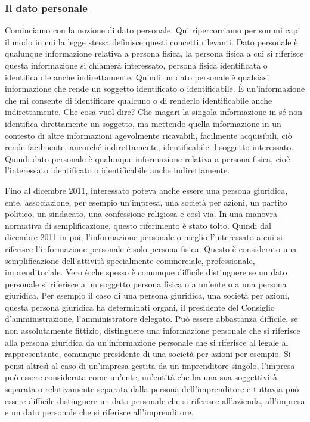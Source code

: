 \subsubsection{Il dato personale}
Cominciamo con la nozione di dato personale. Qui ripercorriamo per sommi capi il modo in cui la legge stessa definisce questi concetti rilevanti. Dato personale è qualunque informazione relativa a persona fisica, la persona fisica a cui si riferisce questa informazione si chiamerà interessato, persona fisica identificata o identificabile anche indirettamente. Quindi un dato personale è qualsiasi informazione che rende un soggetto identificato o identificabile. 
È un'informazione che mi consente di identificare qualcuno o di renderlo identificabile anche indirettamente. 
Che cosa vuol dire? Che magari la singola informazione in sé non identifica direttamente un soggetto, ma mettendo quella informazione in un contesto di altre informazioni agevolmente ricavabili, facilmente acquisibili, ciò rende facilmente, ancorché indirettamente, identificabile il soggetto interessato. Quindi dato personale è qualunque informazione relativa a persona fisica, cioè l'interessato identificato o identificabile anche indirettamente. 

Fino al dicembre 2011, interessato poteva anche essere una persona giuridica, ente, associazione, per esempio un'impresa, una società per azioni, un partito politico, un sindacato, una confessione religiosa e così via. In una manovra normativa di semplificazione, questo riferimento è stato tolto. Quindi dal dicembre 2011 in poi, l'informazione personale o meglio l'interessato a cui si riferisce l'informazione personale è solo persona fisica. Questo è considerato una semplificazione dell'attività specialmente commerciale, professionale, imprenditoriale. Vero è che spesso è comunque difficile distinguere se un dato personale si riferisce a un soggetto persona fisica o a un'ente o a una persona giuridica. Per esempio il caso di una persona giuridica, una società per azioni, questa persona giuridica ha determinati organi, il presidente del Consiglio d'amministrazione, l'amministratore delegato. Può essere abbastanza difficile, se non assolutamente fittizio, distinguere una informazione personale che si riferisce alla persona giuridica da un'informazione personale che si riferisce al legale al rappresentante, comunque presidente di una società per azioni per esempio. Si pensi altresì al caso di un'impresa gestita da un imprenditore singolo, l'impresa può essere considerata come un'ente, un'entità che ha una sua soggettività separata o relativamente separata dalla persona dell'imprenditore e tuttavia può essere difficile distinguere un dato personale che si riferisce all'azienda, all'impresa e un dato personale che si riferisce all'imprenditore. 

